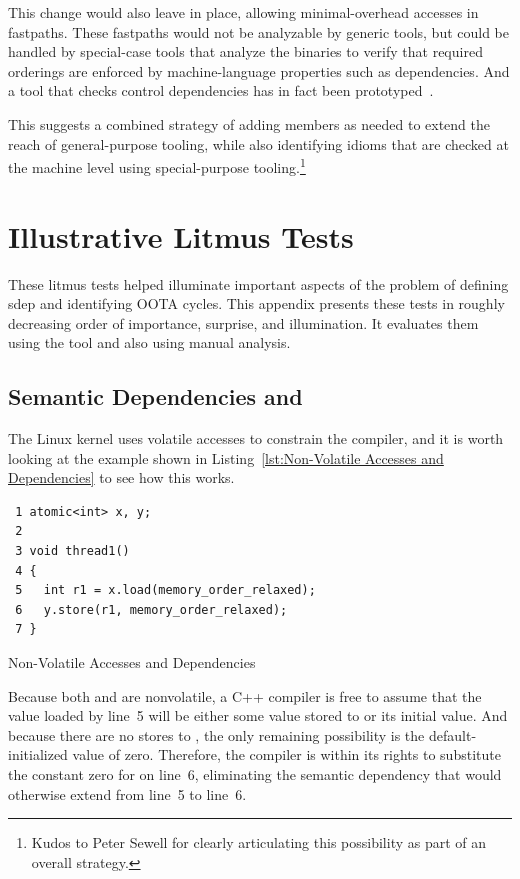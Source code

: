 \documentclass[10]{article}
\begin{document}
This change would also leave  in place,
allowing minimal-overhead accesses in fastpaths.
These fastpaths would not be analyzable by generic tools, but could
be handled by special-case tools that analyze the binaries to verify
that required orderings are enforced by machine-language properties
such as dependencies.
And a tool that checks control dependencies has in fact been
prototyped~\cite{PaulHeidekrueger2022N4910}.

This suggests a combined strategy of adding  members
as needed to extend the reach of general-purpose tooling, while also
identifying  idioms that are checked at the
machine level using special-purpose tooling.\footnote{
	Kudos to Peter Sewell for clearly articulating this possibility
	as part of an overall strategy.}

\clearpage

\section{Illustrative Litmus Tests}
\label{app:Illustrative Litmus Tests}

These litmus tests helped illuminate important aspects of the problem
of defining sdep and identifying OOTA cycles.
This appendix presents these tests in roughly decreasing order of
importance, surprise, and illumination.
It evaluates them using the  tool and also using manual
analysis.

\subsection{Semantic Dependencies and }
\label{app:Semantic Dependencies and volatile}

The Linux kernel uses volatile accesses to constrain the compiler,
and it is worth looking at the example shown in
Listing~\ref{lst:Non-Volatile Accesses and Dependencies}
to see how this works.

\begin{listing}
\begin{verbatim}
 1 atomic<int> x, y;
 2
 3 void thread1()
 4 {
 5   int r1 = x.load(memory_order_relaxed);
 6   y.store(r1, memory_order_relaxed);
 7 }
\end{verbatim}
\caption{Non-Volatile Accesses and Dependencies}
\label{lst:Non-Volatile Accesses and Dependencies}
\end{listing}

Because both  and  are nonvolatile, a C++ compiler is
free to assume that the value loaded by line~5 will be either some value
stored to  or its initial value.
And because there are no stores to , the only remaining possibility
is the default-initialized value of zero.
Therefore, the compiler is within its rights to substitute
the constant zero for  on line~6, eliminating the semantic
dependency that would otherwise extend from line~5 to line~6.
\end{document}
